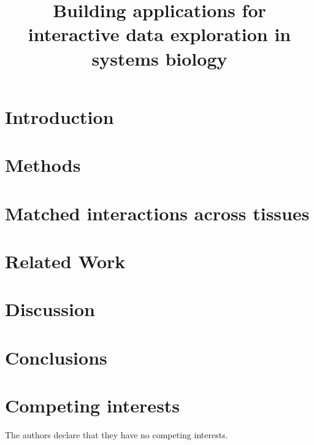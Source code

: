 \documentclass[sigconf]{acmart}
\begin{document}
\title{Building applications for interactive data exploration in systems biology}

 
 

\maketitle

\section*{Introduction}
 

\section*{Methods} 
 

\section*{Matched interactions across tissues}
 

\section*{Related Work}
 

\section*{Discussion} 
 

\section*{Conclusions}
 

\section*{Competing interests}
The authors declare that they have no competing interests.



\end{document}
